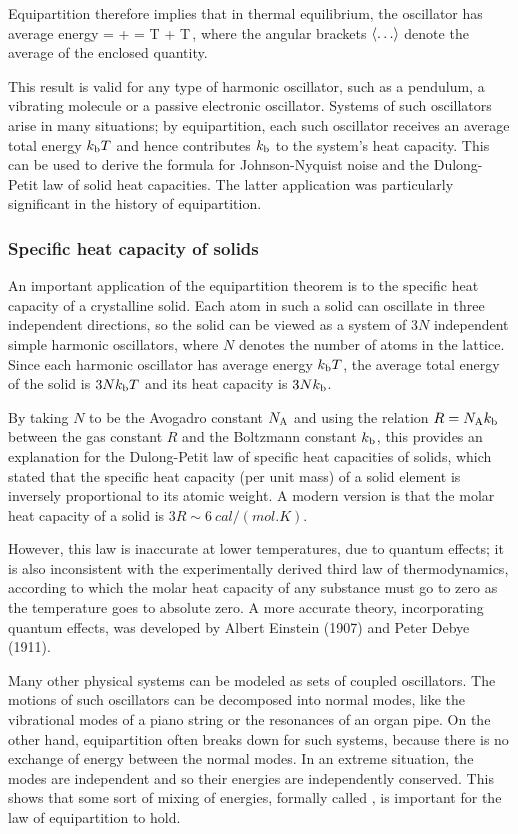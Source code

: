 Equipartition therefore implies that in thermal equilibrium, the oscillator has average energy
\beq
\avg{\ham} = \avg{\hken} + \avg{\hpen} = \boltz T + \boltz T\,,
\eeq
where the angular brackets $\left\langle{\dots}\right\rangle$ denote the average of the enclosed quantity.

This result is valid for any type of harmonic oscillator, such as a pendulum, a vibrating molecule or a passive electronic oscillator. Systems of such oscillators arise in many situations; by equipartition, each such oscillator receives an average total energy $k_\text{b} T$ and hence contributes $k_\text{b}$ to the system's heat capacity. This can be used to derive the formula for Johnson-Nyquist noise and the Dulong-Petit law of solid heat capacities. The latter application was particularly significant in the history of equipartition.


\subsubsection{Specific heat capacity of solids}
An important application of the equipartition theorem is to the specific heat capacity of a crystalline solid. Each atom in such a solid can oscillate in three independent directions, so the solid can be viewed as a system of $3N$ independent simple harmonic oscillators, where $N$ denotes the number of atoms in the lattice. Since each harmonic oscillator has average energy $k_\text{b} T$, the average total energy of the solid is $3Nk_\text{b} T$ and its heat capacity is $3Nk_\text{b}$.

By taking $N$ to be the Avogadro constant $N_\text{A}$ and using the relation $R = N_\text{A}k_\text{b}$ between the gas constant $R$ and the Boltzmann constant $k_\text{b}$, this provides an explanation for the Dulong-Petit law of specific heat capacities of solids, which stated that the specific heat capacity (per unit mass) of a solid element is inversely proportional to its atomic weight. A modern version is that the molar heat capacity of a solid is $3R\sim \SI{6}{cal/(mol.K)}$.

However, this law is inaccurate at lower temperatures, due to quantum effects; it is also inconsistent with the experimentally derived third law of thermodynamics, according to which the molar heat capacity of any substance must go to zero as the temperature goes to absolute zero. A more accurate theory, incorporating quantum effects, was developed by Albert Einstein (1907) and Peter Debye (1911).

Many other physical systems can be modeled as sets of coupled oscillators. The motions of such oscillators can be decomposed into normal modes, like the vibrational modes of a piano string or the resonances of an organ pipe. On the other hand, equipartition often breaks down for such systems, because there is no exchange of energy between the normal modes. In an extreme situation, the modes are independent and so their energies are independently conserved. This shows that some sort of mixing of energies, formally called , is important for the law of equipartition to hold.


